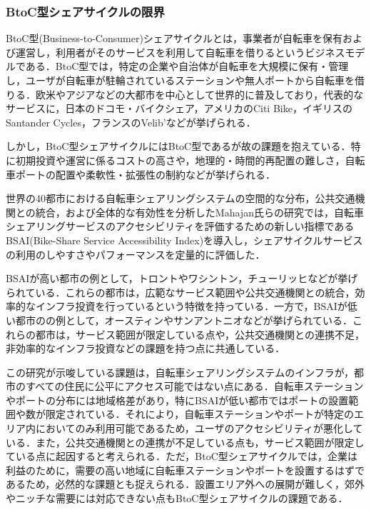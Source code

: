       \subsubsection{BtoC型シェアサイクルの限界}
        \label{sec:BtoC型シェアサイクルの限界}
          \par BtoC型(Business-to-Consumer)シェアサイクルとは，事業者が自転車を保有および運営し，利用者がそのサービスを利用して自転車を借りるというビジネスモデルである．BtoC型では，特定の企業や自治体が自転車を大規模に保有・管理し，ユーザが自転車が駐輪されているステーションや無人ポートから自転車を借りる．欧米やアジアなどの大都市を中心として世界的に普及しており，代表的なサービスに，日本のドコモ・バイクシェア，アメリカのCiti Bike，イギリスのSantander Cycles，フランスのVelib’などが挙げられる．
          \par しかし，BtoC型シェアサイクルにはBtoC型であるが故の課題を抱えている．特に初期投資や運営に係るコストの高さや，地理的・時間的再配置の難しさ，自転車ポートの配置や柔軟性・拡張性の制約などが挙げられる．
          \par 世界の40都市における自転車シェアリングシステムの空間的な分布，公共交通機関との統合，および全体的な有効性を分析したMahajan氏らの研究では，自転車シェアリングサービスのアクセシビリティを評価するための新しい指標であるBSAI(Bike-Share Service Accessibility Index)を導入し，シェアサイクルサービスの利用のしやすさやパフォーマンスを定量的に評価した．
          \par BSAIが高い都市の例として，トロントやワシントン，チューリッヒなどが挙げられている．これらの都市は，広範なサービス範囲や公共交通機関との統合，効率的なインフラ投資を行っているという特徴を持っている．一方で，BSAIが低い都市のの例として，オースティンやサンアントニオなどが挙げられている．これらの都市は，サービス範囲が限定している点や，公共交通機関との連携不足，非効率的なインフラ投資などの課題を持つ点に共通している．
          \par この研究が示唆している課題は，自転車シェアリングシステムのインフラが，都市のすべての住民に公平にアクセス可能ではない点にある．自転車ステーションやポートの分布には地域格差があり，特にBSAIが低い都市ではポートの設置範囲や数が限定されている．それにより，自転車ステーションやポートが特定のエリア内においてのみ利用可能であるため，ユーザのアクセシビリティが悪化している．また，公共交通機関との連携が不足している点も，サービス範囲が限定している点に起因すると考えられる．ただ，BtoC型シェアサイクルでは，企業は利益のために，需要の高い地域に自転車ステーションやポートを設置するはずであるため，必然的な課題とも捉えられる．設置エリア外への展開が難しく，郊外やニッチな需要には対応できない点もBtoC型シェアサイクルの課題である．

